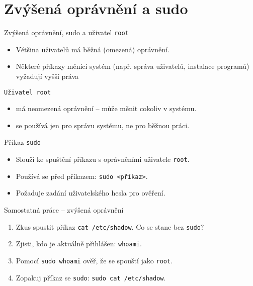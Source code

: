 \documentclass{beamer}
\begin{document}
\section{Zvýšená oprávnění a sudo}
\begin{frame}{Zvýšená oprávnění, sudo a uživatel \texttt{root}}
	\begin{itemize}
		\item Většina uživatelů má běžná (omezená) oprávnění.
		\item Některé příkazy měnící systém (např. správa uživatelů, instalace programů) vyžadují vyšší práva
	\end{itemize}
	
	\begin{block}{\texttt{Uživatel root}}
		\begin{itemize}
			\item má neomezená oprávnění – může měnit cokoliv v systému.
			\item se používá jen pro správu systému, ne pro běžnou práci.
		\end{itemize}
	\end{block}
	\begin{block}{Příkaz \texttt{sudo}}
		\begin{itemize}
			\item Slouží ke spuštění příkazu s oprávněními uživatele \texttt{root}.
			\item Používá se před příkazem: \texttt{sudo <příkaz>}.
			\item Požaduje zadání uživatelského hesla pro ověření.
		\end{itemize}
	\end{block}

\end{frame}

\begin{frame}{Samostatná práce – zvýšená oprávnění}
	\small
	\begin{enumerate}
		\item Zkus spustit příkaz \texttt{cat /etc/shadow}.  
		Co se stane bez \texttt{sudo}?
		\item Zjisti, kdo je aktuálně přihlášen: \texttt{whoami}.
		\item Pomocí \texttt{sudo whoami} ověř, že se spouští jako \texttt{root}.
		\item Zopakuj příkaz se \texttt{sudo}: \texttt{sudo cat /etc/shadow}.
	\end{enumerate}
\end{frame}
\end{document}
